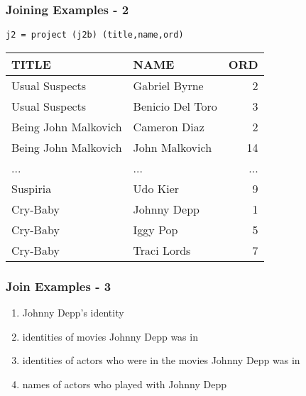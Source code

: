 \documentclass[dvipsnames]{beamer}
\theoremstyle{plain}
\begin{document}
\begin{frame}[fragile]
  \frametitle{Joining Examples - 2}

  \begin{example}
    \begin{lstlisting}
j2 = project (j2b) (title,name,ord)
    \end{lstlisting}

    \pause
    \begin{tiny}
    \begin{table}
      \begin{tabular}{|l|l|r|}\hline
TITLE                & NAME             & ORD\\\hline\hline
Usual Suspects       & Gabriel Byrne    &   2\\\hline
Usual Suspects       & Benicio Del Toro &   3\\\hline
Being John Malkovich & Cameron Diaz     &   2\\\hline
Being John Malkovich & John Malkovich   &  14\\\hline
...                  & ...              & ...\\\hline
Suspiria             & Udo Kier         &   9\\\hline
Cry-Baby             & Johnny Depp      &   1\\\hline
Cry-Baby             & Iggy Pop         &   5\\\hline
Cry-Baby             & Traci Lords      &   7\\\hline
      \end{tabular}
    \end{table}
    \end{tiny}
  \end{example}
\end{frame}

\begin{frame}
  \frametitle{Join Examples - 3}

  \begin{example}
    \pause
    \begin{enumerate}
      \item Johnny Depp's identity

      \pause
      \item identities of movies Johnny Depp was in

      \pause
      \item identities of actors who were in the movies Johnny Depp was in

      \pause
      \item names of actors who played with Johnny Depp
    \end{enumerate}
  \end{example}
\end{frame}
\end{document}
